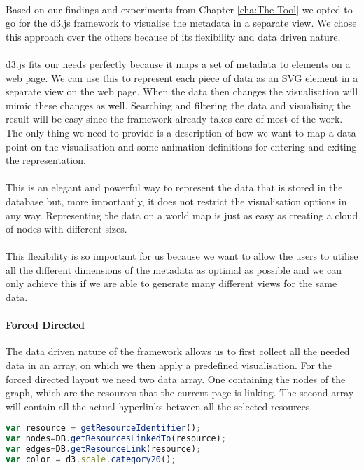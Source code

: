 	\paragraph{}
	Based on our findings and experiments from Chapter \ref{cha:The Tool} we opted to go for the d3.js framework to visualise the metadata in a separate view. We chose this approach over the others because of its flexibility and data driven nature.
	\paragraph{}
	d3.js fits our needs perfectly because it maps a set of metadata to elements on a web page. We can use this to represent each piece of data as an SVG element in a separate view on the web page. When the data then changes the visualisation will mimic these changes as well. Searching and filtering the data and visualising the result will be easy since the framework already takes care of most of the work. The only thing we need to provide is a description of how we want to map a data point on the visualisation and some animation definitions for entering and exiting the representation.
	\paragraph{}
	This is an elegant and powerful way to represent the data that is stored in the database but, more importantly, it does not restrict the visualisation options in any way. Representing the data on a world map is just as easy as creating a cloud of nodes with different sizes.
	\paragraph{}
	This flexibility is so important for us because we want to allow the users to utilise all the different dimensions of the metadata as optimal as possible and we can only achieve this if we are able to generate many different views for the same data.
	\paragraph{Forced Directed}
	The data driven nature of the framework allows us to first collect all the needed data in an array, on which we then apply a predefined visualisation. For the forced directed layout we need two data array. One containing the nodes of the graph, which are the resources that the current page is linking. The second array will contain all the actual hyperlinks between all the selected resources.
	\begin{lstlisting}[language=JavaScript]
var resource = getResourceIdentifier();
var nodes=DB.getResourcesLinkedTo(resource);
var edges=DB.getResourceLink(resource);
var color = d3.scale.category20();

	\end{lstlisting}
